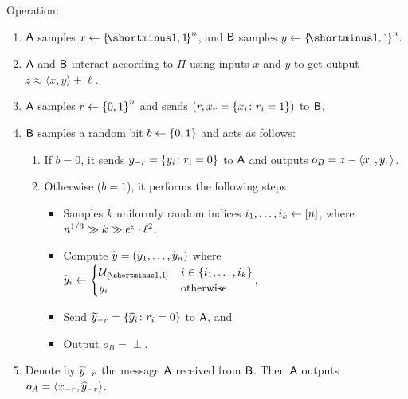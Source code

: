\begin{protocol}[\AWEC]\label{protocol:intro:DPIP-to-AWEC}
	\item Operation:
	\begin{enumerate}
		
		\item $\mathsf{A}$ samples $x\gets \oo^n$, and $\mathsf{B}$ samples $y\gets \oo^n$.
        \item $\mathsf{A}$ and $\mathsf{B}$ interact according to $\Pi$ using inputs $x$ and $y$ \resp to get output $z\approx \langle x,y \rangle \pm \ell$. 
		\item  $\mathsf{A}$ samples  $r \la \zo^n$ and sends $(r,x_{r} = \set{x_i \colon r_i =1})$ to $\mathsf{B}$.
		
		\item $\mathsf{B}$ samples a random bit $b \la \zo$ and acts as follows:
		
		\begin{enumerate}
			
			\item If $b=0$, it sends $y_{-r}= \set{y_i \colon r_i =0}$ to $\mathsf{A}$ and outputs $o_B = z - \langle x_r, y_r \rangle$.
			
			\item Otherwise ($b=1$), it performs the following steps:
			
			\begin{itemize}
				\item Samples $k$ uniformly random indices $i_1,\ldots,i_k \gets [n]$, where $n^{1/3} \gg k \gg  e^{\varepsilon} \cdot  \ell^2$.
				\item Compute $\widetilde{y} = (\widetilde{y}_1,\ldots,\widetilde{y}_n)$ where $\ty_i \la \begin{cases} \cU_{\oo} & i \in \set{i_1,\ldots,i_k} \\ y_i & \text{otherwise} \end{cases}$,
				\item Send $\ty_{-r}= \set{\ty_i \colon r_i =0}$ to $\mathsf{A}$, and
				\item Output $o_B = \perp$.
			\end{itemize}
			
			
		\end{enumerate}
		
		\item  Denote by $\widehat{y}_{-r}$ the message $\mathsf{A}$ received from $\mathsf{B}$. Then $\mathsf{A}$ outputs $o_A =  \langle x_{-r}, \widehat{y}_{-r} \rangle$.
		
		
	\end{enumerate}
\end{protocol}
